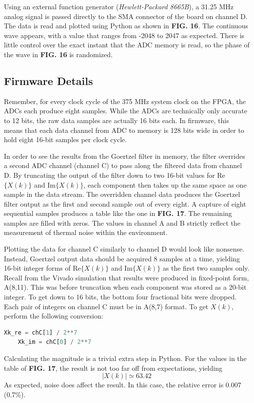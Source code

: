 \documentclass[reprint,amsmath,amssymb]{revtex4-2}
\begin{document}
Using an external function generator (\textit{Hewlett-Packard 8665B}), a 31.25 MHz analog signal is passed directly to the SMA connector of the board on channel D. The data is read and plotted using Python as shown in \textbf{FIG. 16}. The continuous wave appears, with a value that ranges from -2048 to 2047 as expected. There is little control over the exact instant that the ADC memory is read, so the phase of the wave in \textbf{FIG. 16} is randomized.

\subsection{Firmware Details}

Remember, for every clock cycle of the 375 MHz system clock on the FPGA, the ADCs each produce eight samples. While the ADCs are technically only accurate to 12 bits, the raw data samples are actually 16 bits each. In firmware, this means that each data channel from ADC to memory is 128 bits wide in order to hold eight 16-bit samples per clock cycle.

In order to see the results from the Goertzel filter in memory, the filter overrides a second ADC channel (channel C) to pass along the filtered data from channel D. By truncating the output of the filter down to two 16-bit values for Re$\{X(k)\}$ and Im$\{X(k)\}$, each component then takes up the same space as one sample in the data stream. The overridden channel data produces the Goertzel filter output as the first and second sample out of every eight. A capture of eight sequential samples produces a table like the one in \textbf{FIG. 17}. The remaining samples are filled with zeros. The values in channel A and B strictly reflect the measurement of thermal noise within the environment.

Plotting the data for channel C similarly to channel D would look like nonsense. Instead, Goertzel output data should be acquired 8 samples at a time, yielding 16-bit integer forms of Re$\{X(k)\}$ and Im$\{X(k)\}$ as the first two samples only. Recall from the Vivado simulation that results were produced in fixed-point form, A(8,11). This was before truncation when each component was stored as a 20-bit integer. To get down to 16 bits, the bottom four fractional bits were dropped. Each pair of integers on channel C must be in A(8,7) format. To get $X(k)$, perform the following conversion:
\begin{lstlisting}[language=Python]
    Xk_re = chC[1] / 2**7
    Xk_im = chC[0] / 2**7
\end{lstlisting}
Calculating the magnitude is a trivial extra step in Python. For the values in the table of \textbf{FIG. 17}, the result is not too far off from expectations, yielding
\begin{equation}
    |X(k)| \simeq 63.42
\end{equation}
As expected, noise does affect the result. In this case, the relative error is 0.007 (0.7\%).
\end{document}
